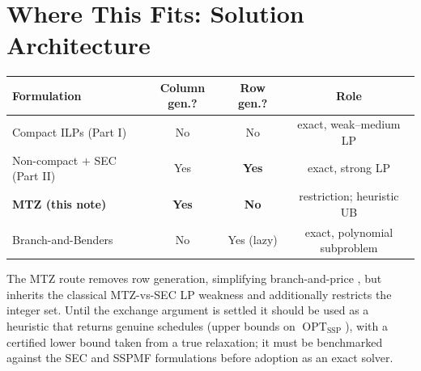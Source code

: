\documentclass[11pt,a4paper]{article}
\theoremstyle{plain}
\theoremstyle{definition}
\DeclareMathOperator{\OPT}{OPT}
\newcommand{\OSSP}{\OPT_{\mathrm{SSP}}}
\begin{document}
\section{Where This Fits: Solution Architecture}
\label{sec:fits}

\begin{center}
\renewcommand{\arraystretch}{1.3}
\begin{tabular}{lccc}
\toprule
\textbf{Formulation} & \textbf{Column gen.?} & \textbf{Row gen.?} & \textbf{Role} \\
\midrule
Compact ILPs (Part I) & No & No & exact, weak--medium LP \\
Non-compact $+$ SEC (Part II) & Yes & \textbf{Yes} & exact, strong LP \\
\textbf{MTZ (this note)} & \textbf{Yes} & \textbf{No} & restriction; heuristic UB \\
Branch-and-Benders & No & Yes (lazy) & exact, polynomial subproblem \\
\bottomrule
\end{tabular}
\end{center}

\medskip
The MTZ route removes row generation, simplifying branch-and-price
\cite{Barnhart1998,Lubbecke2005}, but inherits the classical MTZ-vs-SEC LP weakness
\cite{Applegate2006} and additionally restricts the integer set. Until the exchange argument
is settled it should be used as a heuristic that returns genuine schedules (upper bounds on
$\OSSP$), with a certified lower bound taken from a true relaxation; it must be benchmarked
against the SEC and SSPMF formulations before adoption as an exact solver.



\end{document}
